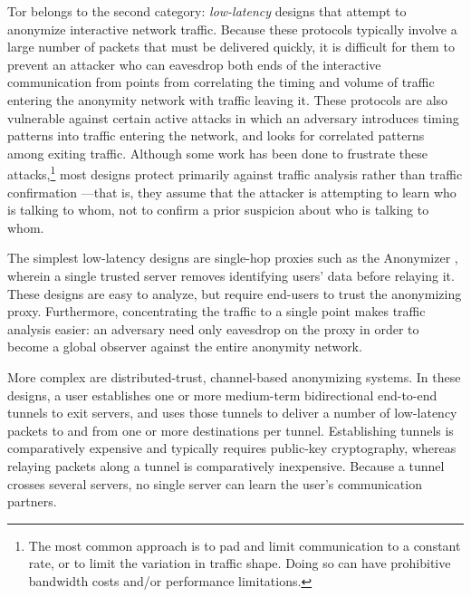 \documentclass[times,10pt,twocolumn]{article}
\begin{document}
Tor belongs to the second category: \emph{low-latency} designs that attempt
to anonymize interactive network traffic.  Because these protocols typically
involve a large number of packets that must be delivered quickly, it is
difficult for them to prevent an attacker who can eavesdrop both ends of the
interactive communication from points from correlating the timing and volume
of traffic entering the anonymity network with traffic leaving it.  These
protocols are also vulnerable against certain active attacks in which an
adversary introduces timing patterns into traffic entering the network, and 
looks
for correlated patterns among exiting traffic.
Although some work has been done to frustrate
these attacks,\footnote{
  The most common approach is to pad and limit communication to a constant
  rate, or to limit
  the variation in traffic shape.  Doing so can have prohibitive bandwidth
  costs and/or performance limitations.
} most designs protect primarily against traffic analysis rather than traffic
confirmation \cite{or-jsac98}---that is, they assume that the attacker is
attempting to learn who is talking to whom, not to confirm a prior suspicion
about who is talking to whom.

The simplest low-latency designs are single-hop proxies such as the
Anonymizer \cite{anonymizer}, wherein a single trusted server removes
identifying users' data before relaying it.  These designs are easy to
analyze, but require end-users to trust the anonymizing proxy.  Furthermore,
concentrating the traffic to a single point makes traffic analysis easier: an
adversary need only eavesdrop on the proxy in order to become a global
observer against the entire anonymity network.

More complex are distributed-trust, channel-based anonymizing systems.  In
these designs, a user establishes one or more medium-term bidirectional
end-to-end tunnels to exit servers, and uses those tunnels to deliver a
number of low-latency packets to and from one or more destinations per
tunnel.  Establishing tunnels is comparatively expensive and typically
requires public-key cryptography, whereas relaying packets along a tunnel is
comparatively inexpensive.  Because a tunnel crosses several servers, no
single server can learn the user's communication partners.
\end{document}
